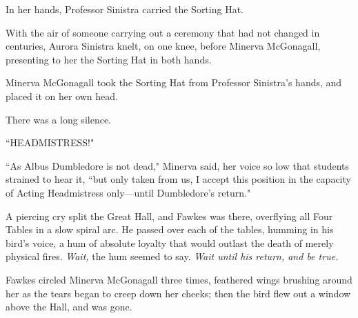 In her hands, Professor Sinistra carried the Sorting Hat.

With the air of someone carrying out a ceremony that had not changed in centuries, Aurora Sinistra knelt, on one knee, before Minerva McGonagall, presenting to her the Sorting Hat in both hands.

Minerva McGonagall took the Sorting Hat from Professor Sinistra's hands, and placed it on her own head.

There was a long silence.

``HEADMISTRESS!"

``As Albus Dumbledore is not dead," Minerva said, her voice so low that students strained to hear it, ``but only taken from us, I accept this position in the capacity of Acting Headmistress only—until Dumbledore's return."

A piercing cry split the Great Hall, and Fawkes was there, overflying all Four Tables in a slow spiral arc. He passed over each of the tables, humming in his bird's voice, a hum of absolute loyalty that would outlast the death of merely physical fires. \emph{Wait,} the hum seemed to say. \emph{Wait until his return, and be true.}

Fawkes circled Minerva McGonagall three times, feathered wings brushing around her as the tears began to creep down her cheeks; then the bird flew out a window above the Hall, and was gone.

